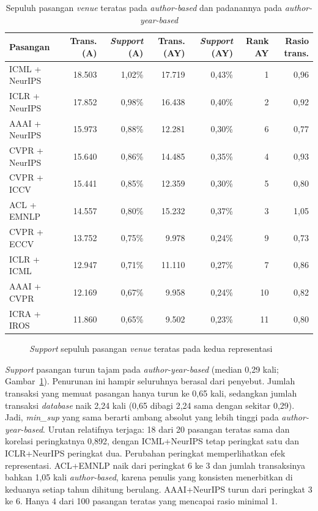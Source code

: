 \begin{table}[ht]
\caption{Sepuluh pasangan \textit{venue} teratas pada \textit{author-based} dan padanannya pada \textit{author-year-based}}
\label{tab:top-pasangan}
\footnotesize
\begin{tabularx}{\textwidth}{@{}>{\raggedright\arraybackslash}X rrrrrr@{}}
\toprule
\textbf{Pasangan} & \textbf{Trans. (A)} & \textbf{\textit{Support} (A)} & \textbf{Trans. (AY)} & \textbf{\textit{Support} (AY)} & \textbf{Rank AY} & \textbf{Rasio trans.} \\
\midrule
ICML + NeurIPS & 18.503 & 1,02\% & 17.719 & 0,43\% & 1 & 0,96 \\
ICLR + NeurIPS & 17.852 & 0,98\% & 16.438 & 0,40\% & 2 & 0,92 \\
AAAI + NeurIPS & 15.973 & 0,88\% & 12.281 & 0,30\% & 6 & 0,77 \\
CVPR + NeurIPS & 15.640 & 0,86\% & 14.485 & 0,35\% & 4 & 0,93 \\
CVPR + ICCV & 15.441 & 0,85\% & 12.359 & 0,30\% & 5 & 0,80 \\
ACL + EMNLP & 14.557 & 0,80\% & 15.232 & 0,37\% & 3 & 1,05 \\
CVPR + ECCV & 13.752 & 0,75\% & 9.978 & 0,24\% & 9 & 0,73 \\
ICLR + ICML & 12.947 & 0,71\% & 11.110 & 0,27\% & 7 & 0,86 \\
AAAI + CVPR & 12.169 & 0,67\% & 9.958 & 0,24\% & 10 & 0,82 \\
ICRA + IROS & 11.860 & 0,65\% & 9.502 & 0,23\% & 11 & 0,80 \\
\bottomrule
\end{tabularx}
\end{table}

\begin{figure}[ht]
\centering
{}
\caption{\textit{Support} sepuluh pasangan \textit{venue} teratas pada kedua representasi}
\label{fig:support-pasangan}
\end{figure}

\textit{Support} pasangan turun tajam pada \textit{author-year-based} (median 0,29 kali; Gambar~\ref{fig:support-pasangan}). Penurunan ini hampir seluruhnya berasal dari penyebut. Jumlah transaksi yang memuat pasangan hanya turun ke 0,65 kali, sedangkan jumlah transaksi \textit{database} naik 2,24 kali (0,65 dibagi 2,24 sama dengan sekitar 0,29). Jadi, \textit{min\_sup} yang sama berarti ambang absolut yang lebih tinggi pada \textit{author-year-based}. Urutan relatifnya terjaga: 18 dari 20 pasangan teratas sama dan korelasi peringkatnya 0,892, dengan ICML+NeurIPS tetap peringkat satu dan ICLR+NeurIPS peringkat dua. Perubahan peringkat memperlihatkan efek representasi. ACL+EMNLP naik dari peringkat 6 ke 3 dan jumlah transaksinya bahkan 1,05 kali \textit{author-based}, karena penulis yang konsisten menerbitkan di keduanya setiap tahun dihitung berulang. AAAI+NeurIPS turun dari peringkat 3 ke 6. Hanya 4 dari 100 pasangan teratas yang mencapai rasio minimal 1.

